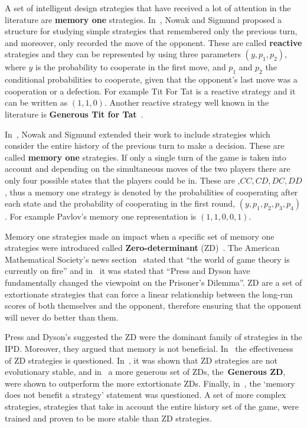 \documentclass{article}
\theoremstyle{definition}
\begin{document}
A set of intelligent design strategies that have received a lot of attention in
the literature are \textbf{memory one} strategies. In~\cite{nowak1989},
Nowak and Sigmund proposed a structure for studying simple strategies that
remembered only the previous turn, and moreover, only recorded the move of the
opponent. These are called \textbf{reactive} strategies and they can be
represented by using three parameters \((y, p_1, p_2)\), where \(y\) is the
probability to cooperate in the first move, and \(p_1\) and \(p_2\) the
conditional probabilities to cooperate, given that the opponent's last move was
a cooperation or a defection. For example Tit For Tat is a reactive strategy and
it can be written as \((1, 1, 0)\). Another reactive strategy well known in
the literature is \textbf{Generous Tit for Tat}~\cite{Nowak1992}.

In~\cite{Nowak1990}, Nowak and Sigmund extended
their work to include strategies which consider the entire history of the previous turn to make a decision.
These are called \textbf{memory one} strategies.
If only a single turn of the game is taken into account and depending on the
simultaneous moves of the two players there are only four possible states that
the players could be in. These are ,\(CC, CD, DC, DD\), thus a memory one strategy
is denoted by the probabilities of cooperating after each state and the probability
of cooperating in the first round, \((y, p_1, p_2, p_3, p_4)\).
For example Pavlov's memory one representation is \((1, 1, 0, 0, 1)\).

Memory one strategies made an impact when a specific set of memory one
strategies were introduced called \textbf{Zero-determinant}
(ZD)~\cite{Press2012}. The American Mathematical Society's news section~\cite{hilbe2015}
stated that ``the world of game theory is currently on fire'' and in~\cite{Stewart2012}
it was stated that
``Press and Dyson have fundamentally changed the viewpoint on the Prisoner's Dilemma''.
ZD are a set of
extortionate strategies that can force a linear relationship between
the long-run scores of both themselves and the opponent, therefore ensuring that the
opponent will never do better than them.

Press and Dyson's suggested the ZD were the dominant family of strategies in the
IPD. Moreover, they argued that memory is not beneficial. In~\cite{Adami2013,
Hilbe2013, Hilbe2013b, hilbe2015, KnightHGC17, Lee2015, Stewart2012} the
effectiveness of ZD strategies is questioned. In~\cite{Adami2013}, it was shown that ZD
strategies are not evolutionary stable, and in~\cite{Stewart2012} a more
generous set of ZDs, the~\textbf{Generous ZD}, were shown to outperform the more
extortionate ZDs. Finally, in~\cite{Lee2015}, the `memory does not benefit a
strategy' statement was questioned. A set of more complex strategies, strategies
that take in account the entire history set of the game, were trained and proven
to be more stable than ZD strategies.
\end{document}
